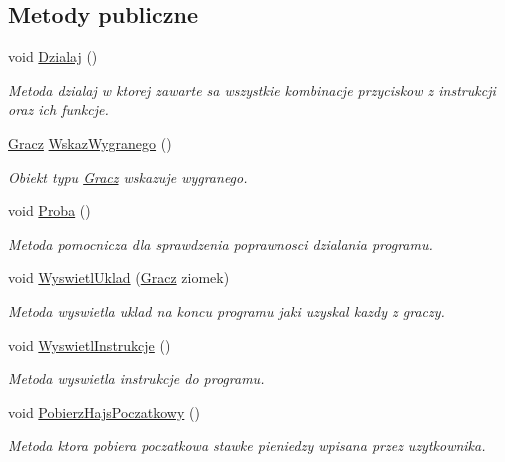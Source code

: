 \subsection*{Metody publiczne}
\begin{DoxyCompactItemize}
\item 
void \hyperlink{class_interfejs_a3082f4dcf5c041d4a7ddb07e3bee08e6}{Dzialaj} ()
\begin{DoxyCompactList}\small\item\em Metoda dzialaj w ktorej zawarte sa wszystkie kombinacje przyciskow z instrukcji oraz ich funkcje. \end{DoxyCompactList}\item 
\hyperlink{class_gracz}{Gracz} \hyperlink{class_interfejs_a7a91a3e36e13d01ed4ce5a39648a1f44}{Wskaz\-Wygranego} ()
\begin{DoxyCompactList}\small\item\em Obiekt typu \hyperlink{class_gracz}{Gracz} wskazuje wygranego. \end{DoxyCompactList}\item 
void \hyperlink{class_interfejs_aac98165513d97397ef3cc37fd3f4cf21}{Proba} ()
\begin{DoxyCompactList}\small\item\em Metoda pomocnicza dla sprawdzenia poprawnosci dzialania programu. \end{DoxyCompactList}\item 
void \hyperlink{class_interfejs_a3270c2153791c6e17414246ac021614f}{Wyswietl\-Uklad} (\hyperlink{class_gracz}{Gracz} ziomek)
\begin{DoxyCompactList}\small\item\em Metoda wyswietla uklad na koncu programu jaki uzyskal kazdy z graczy. \end{DoxyCompactList}\item 
void \hyperlink{class_interfejs_a4a3271fa03c1187ca79c659da858219f}{Wyswietl\-Instrukcje} ()
\begin{DoxyCompactList}\small\item\em Metoda wyswietla instrukcje do programu. \end{DoxyCompactList}\item 
void \hyperlink{class_interfejs_a70ba70fc2dcbf4979e7887e3e8509cbe}{Pobierz\-Hajs\-Poczatkowy} ()
\begin{DoxyCompactList}\small\item\em Metoda ktora pobiera poczatkowa stawke pieniedzy wpisana przez uzytkownika. \end{DoxyCompactList}\item 

\end{DoxyCompactItemize}
